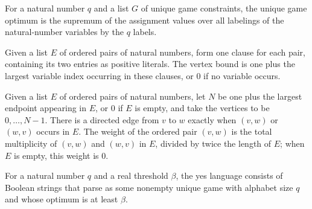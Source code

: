 \begin{definition}
\label{BooleanAnalysis.GaussianSpace.UniqueGames.uniqueGameOptimum}
\leanok
{}
For a natural number $q$ and a list $G$ of unique game constraints, the unique game
optimum is the supremum of the assignment values over all labelings of the
natural-number variables by the $q$ labels.
\end{definition}

\begin{definition}
\label{BooleanAnalysis.GaussianSpace.UniqueGames.maxCutVertexBound}
\leanok
{}
Given a list $E$ of ordered pairs of natural numbers, form one clause for each pair,
containing its two entries as positive literals. The vertex bound is one plus the
largest variable index occurring in these clauses, or $0$ if no variable occurs.
\end{definition}

\begin{definition}
\label{BooleanAnalysis.GaussianSpace.UniqueGames.maxCutGraph}
\leanok
{}
Given a list $E$ of ordered pairs of natural numbers, let $N$ be one plus the largest
endpoint appearing in $E$, or $0$ if $E$ is empty, and take the vertices to be
$0,\ldots,N-1$. There is a directed edge from $v$ to $w$ exactly when $(v,w)$ or $(w,v)$
occurs in $E$. The weight of the ordered pair $(v,w)$ is the total multiplicity of
$(v,w)$ and $(w,v)$ in $E$, divided by twice the length of $E$; when $E$ is empty, this
weight is $0$.
\end{definition}

\begin{definition}
\label{BooleanAnalysis.GaussianSpace.UniqueGames.uniqueGameYes}
\leanok
{}
For a natural number $q$ and a real threshold $\beta$, the yes language consists of
Boolean strings that parse as some nonempty unique game with alphabet size $q$ and whose
optimum is at least $\beta$.
\end{definition}

